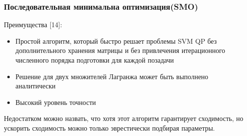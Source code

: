 \documentclass[12pt,a4paper]{article}
\begin{document}
	\subsubsection{Последовательная минимальна оптимизация(SMO)}
	Преимущества [14]:
	\begin{itemize}
		\item Простой алгоритм, который быстро решает проблемы SVM QP без дополнительного хранения матрицы и без привлечения итерационного численного порядка подготовки для каждой позадачи
		\item Решение для двух множителей Лагранжа может быть выполнено
		аналитически
		\item Высокий уровень точности
	\end{itemize}
	
	Недостатком можно назвать, что хотя этот алгоритм гарантирует сходимость, но ускорить сходимость можно только эврестически подбирая параметры.
\end{document}
